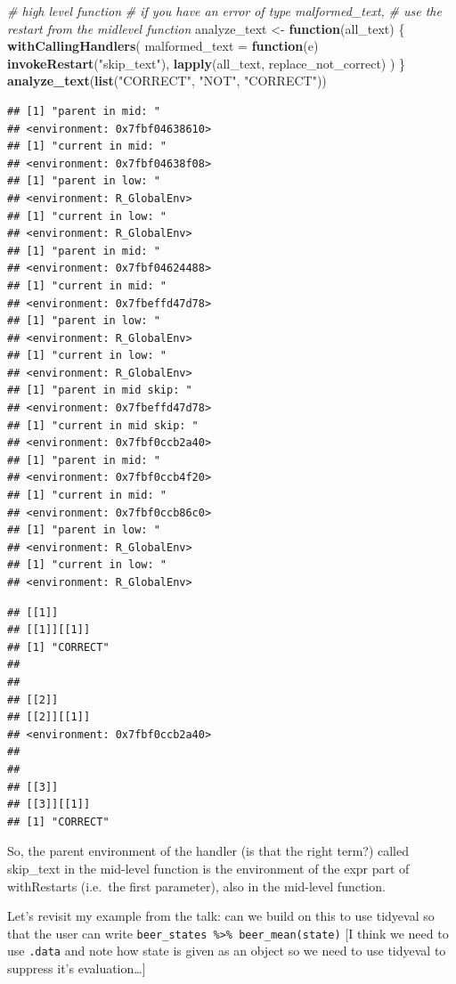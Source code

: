\documentclass[]{book}
\newenvironment{Shaded}{\begin{snugshade}}{\end{snugshade}}
\newcommand{\CommentTok}[1]{\textcolor[rgb]{0.56,0.35,0.01}{\textit{#1}}}
\newcommand{\ControlFlowTok}[1]{\textcolor[rgb]{0.13,0.29,0.53}{\textbf{#1}}}
\newcommand{\DataTypeTok}[1]{\textcolor[rgb]{0.13,0.29,0.53}{#1}}
\newcommand{\KeywordTok}[1]{\textcolor[rgb]{0.13,0.29,0.53}{\textbf{#1}}}
\newcommand{\NormalTok}[1]{#1}
\newcommand{\StringTok}[1]{\textcolor[rgb]{0.31,0.60,0.02}{#1}}
\begin{document}
\begin{Shaded}
\begin{Highlighting}[]
\CommentTok{# high level function}
\CommentTok{# if you have an error of type malformed_text, }
\CommentTok{# use the restart from the midlevel function}
\NormalTok{analyze_text <-}\StringTok{ }\ControlFlowTok{function}\NormalTok{(all_text) \{}
  \KeywordTok{withCallingHandlers}\NormalTok{(}
    \DataTypeTok{malformed_text =} \ControlFlowTok{function}\NormalTok{(e) }\KeywordTok{invokeRestart}\NormalTok{(}\StringTok{"skip_text"}\NormalTok{),}
    \KeywordTok{lapply}\NormalTok{(all_text, replace_not_correct)}
\NormalTok{  )}
\NormalTok{\}}
\KeywordTok{analyze_text}\NormalTok{(}\KeywordTok{list}\NormalTok{(}\StringTok{"CORRECT"}\NormalTok{, }\StringTok{"NOT"}\NormalTok{, }\StringTok{"CORRECT"}\NormalTok{))}
\end{Highlighting}
\end{Shaded}

\begin{verbatim}
## [1] "parent in mid: "
## <environment: 0x7fbf04638610>
## [1] "current in mid: "
## <environment: 0x7fbf04638f08>
## [1] "parent in low: "
## <environment: R_GlobalEnv>
## [1] "current in low: "
## <environment: R_GlobalEnv>
## [1] "parent in mid: "
## <environment: 0x7fbf04624488>
## [1] "current in mid: "
## <environment: 0x7fbeffd47d78>
## [1] "parent in low: "
## <environment: R_GlobalEnv>
## [1] "current in low: "
## <environment: R_GlobalEnv>
## [1] "parent in mid skip: "
## <environment: 0x7fbeffd47d78>
## [1] "current in mid skip: "
## <environment: 0x7fbf0ccb2a40>
## [1] "parent in mid: "
## <environment: 0x7fbf0ccb4f20>
## [1] "current in mid: "
## <environment: 0x7fbf0ccb86c0>
## [1] "parent in low: "
## <environment: R_GlobalEnv>
## [1] "current in low: "
## <environment: R_GlobalEnv>
\end{verbatim}

\begin{verbatim}
## [[1]]
## [[1]][[1]]
## [1] "CORRECT"
## 
## 
## [[2]]
## [[2]][[1]]
## <environment: 0x7fbf0ccb2a40>
## 
## 
## [[3]]
## [[3]][[1]]
## [1] "CORRECT"
\end{verbatim}

So, the parent environment of the handler (is that the right term?) called skip\_text in the mid-level function is the environment of the expr part of withRestarts (i.e.~the first parameter), also in the mid-level function.

Let's revisit my example from the talk: can we build on this to use tidyeval so that the user can write \texttt{beer\_states\ \%\textgreater{}\%\ beer\_mean(state)} {[}I think we need to use \texttt{.data} and note how state is given as an object so we need to use tidyeval to suppress it's evaluation\ldots{}{]}
\end{document}
